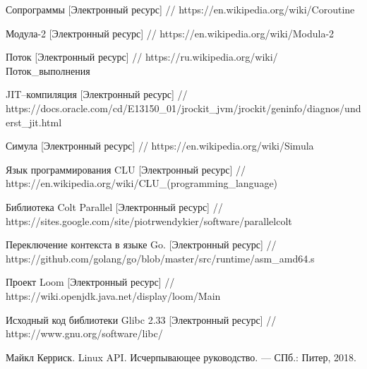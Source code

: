\begingroup 
\renewcommand{\section}[2]{\anonsection{Библиографический список}}
\begin{thebibliography}{}

    Сопрограммы
    [Электронный ресурс] //
    https://en.wikipedia.org/wiki/Coroutine

	Модула-2
	[Электронный ресурс] //
	https://en.wikipedia.org/wiki/Modula-2
	
	Поток
	[Электронный ресурс] //
	https://ru.wikipedia.org/wiki/Поток\_выполнения
	
	JIT--компиляция 
	[Электронный ресурс] //
	https://docs.oracle.com/cd/E13150\_01/jrockit\_jvm/jrockit/geninfo/diagnos/underst\_jit.html
	
	Симула
	[Электронный ресурс] //
	https://en.wikipedia.org/wiki/Simula
	
	Язык программирования CLU
	[Электронный ресурс] //
	https://en.wikipedia.org/wiki/CLU\_(programming\_language)
	
	Библиотека Colt Parallel
	[Электронный ресурс] //
	https://sites.google.com/site/piotrwendykier/software/parallelcolt
	
	Переключение контекста в языке Go.
	[Электронный ресурс] //
	https://github.com/golang/go/blob/master/src/runtime/asm\_amd64.s
	
	Проект Loom
	[Электронный ресурс] //
	https://wiki.openjdk.java.net/display/loom/Main
	
	Исходный код библиотеки Glibc 2.33
	[Электронный ресурс] //
	https://www.gnu.org/software/libc/ %

	Майкл Керриск. Linux API. Исчерпывающее руководство. — СПб.: Питер, 2018.

\end{thebibliography}
\endgroup

\clearpage
